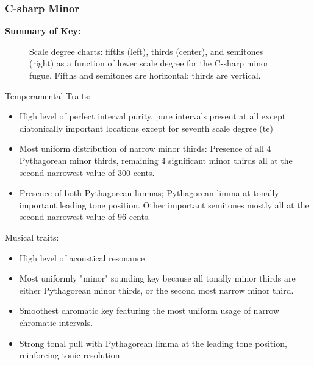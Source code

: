     \subsubsection{C-sharp Minor}\label{c-sharp-minor}

\textbf{Summary of Key:}



\begin{figure}[H]
\vspace{1.5em}
    \centering
    \caption[Scale degree charts: fifths, thirds, and semitones as a function of lower scale degree for the C-sharp minor fugue. ]{Scale degree charts: fifths (left), thirds (center), and semitones (right) as a function of lower scale degree for the C-sharp minor fugue. Fifths and semitones are horizontal; thirds are vertical.}
\end{figure}    Temperamental Traits:

\begin{itemize}
\tightlist
\item
  High level of perfect interval purity, pure intervals present at all
  except diatonically important locations except for seventh scale
  degree (te)
\item
  Most uniform distribution of narrow minor thirds: Presence of all 4
  Pythagorean minor thirds, remaining 4 significant minor thirds all at
  the second narrowest value of 300 cents.
\item
  Presence of both Pythagorean limmas; Pythagorean limma at tonally
  important leading tone position. Other important semitones mostly all
  at the second narrowest value of 96 cents.
\end{itemize}

Musical traits:

\begin{itemize}
\tightlist
\item
  High level of acoustical resonance
\item
  Most uniformly "minor" sounding key because all tonally minor thirds
  are either Pythagorean minor thirds, or the second most narrow minor
  third.
\item
  Smoothest chromatic key featuring the most uniform usage of narrow
  chromatic intervals.
\item
  Strong tonal pull with Pythagorean limma at the leading tone position,
  reinforcing tonic resolution.
\end{itemize}

